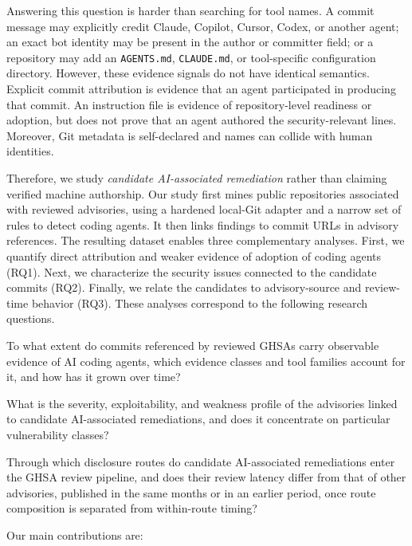 \documentclass[smallextended,natbib]{svjour3}
\newcommand{\tool}[1]{\texttt{#1}}
\begin{document}
Answering this question is harder than searching for tool names.  A commit
message may explicitly credit Claude, Copilot, Cursor, Codex, or another agent;
an exact bot identity may be present in the author or committer field; or a
repository may add an \tool{AGENTS.md}, \tool{CLAUDE.md}, or tool-specific
configuration directory. However, these evidence signals do not have identical semantics.
Explicit commit attribution is evidence that an agent participated in
producing that commit.
An instruction file is evidence of repository-level readiness or adoption, but
does not prove that an agent authored the security-relevant lines.  Moreover,
Git metadata is self-declared and names can collide with human identities.

Therefore, we study \emph{candidate AI-associated remediation} rather than
claiming verified machine authorship.  Our study first mines public
repositories associated with reviewed advisories, using a hardened local-Git
adapter and  a narrow set of rules to detect coding agents.  It then links findings to
commit URLs in advisory references.  The resulting dataset enables three
complementary analyses.  First, we quantify direct attribution and weaker
 evidence of adoption of coding agents (RQ1). Next, we characterize the security issues connected
to the candidate commits (RQ2). Finally, we relate the candidates to
advisory-source and review-time behavior (RQ3).  These analyses correspond to
the following research questions.

\begin{description}[leftmargin=1.6cm,labelwidth=1.1cm,labelsep=0.2cm,align=right,style=nextline]
\item[RQ1.] To what extent do commits referenced by reviewed GHSAs carry
observable evidence of AI coding agents, which evidence classes and tool
families account for it, and how has it grown over time?
\item[RQ2.] What is the severity, exploitability, and weakness profile of the
advisories linked to candidate AI-associated remediations, and does it
concentrate on particular vulnerability classes?
\item[RQ3.] Through which disclosure routes do candidate AI-associated
remediations enter the GHSA review pipeline, and does their review latency
differ from that of other advisories, published in the same months or in an 
earlier   period, once route composition is separated from
within-route timing?
\end{description}

Our main contributions are:
\end{document}
